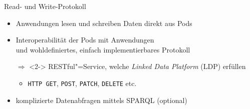 \begin{frame}{Read- und Write-Protokoll \footnotesize\cite{mecklerWebLinkedData2023,sambraSolidPlatformDecentralized2016}}
    \begin{itemize}
        \item Anwendungen lesen und schreiben Daten direkt aus Pods
        \item Interoperabilität der Pods mit Anwendungen\\
            und wohldefiniertes, einfach implementierbares Protokoll
        \item[$\Rightarrow$]<2-> RESTful"=Service, welche \emph{Linked Data Platform} (LDP) erfüllen
        \begin{itemize}
            \item<2-> \texttt{HTTP GET}, \texttt{POST}, \texttt{PATCH}, \texttt{DELETE} etc.~\cite{sambraSolidPlatformDecentralized2016}
        \end{itemize}

        \item<3-> komplizierte Datenabfragen mittels SPARQL (optional)
    \end{itemize}
\end{frame}





